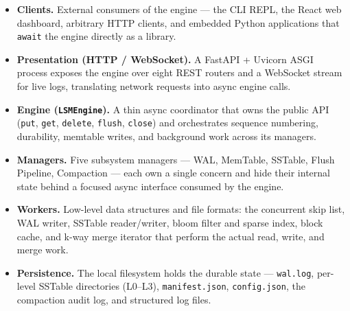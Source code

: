 \documentclass[oneside,a4paper,12pt]{book}
\begin{document}
\begin{itemize}[leftmargin=2em]
      \item \textbf{Clients.} External consumers of the engine --- the CLI REPL, the React web dashboard, arbitrary HTTP clients, and embedded Python applications that \texttt{await} the engine directly as a library.
      \item \textbf{Presentation (HTTP / WebSocket).} A FastAPI + Uvicorn ASGI process exposes the engine over eight REST routers and a WebSocket stream for live logs, translating network requests into async engine calls.
      \item \textbf{Engine (\texttt{LSMEngine}).} A thin async coordinator that owns the public API (\texttt{put}, \texttt{get}, \texttt{delete}, \texttt{flush}, \texttt{close}) and orchestrates sequence numbering, durability, memtable writes, and background work across its managers.
      \item \textbf{Managers.} Five subsystem managers --- WAL, MemTable, SSTable, Flush Pipeline, Compaction --- each own a single concern and hide their internal state behind a focused async interface consumed by the engine.
      \item \textbf{Workers.} Low-level data structures and file formats: the concurrent skip list, WAL writer, SSTable reader/writer, bloom filter and sparse index, block cache, and k-way merge iterator that perform the actual read, write, and merge work.
      \item \textbf{Persistence.} The local filesystem holds the durable state --- \texttt{wal.log}, per-level SSTable directories (L0--L3), \texttt{manifest.json}, \texttt{config.json}, the compaction audit log, and structured log files.
  \end{itemize}


\end{document}
